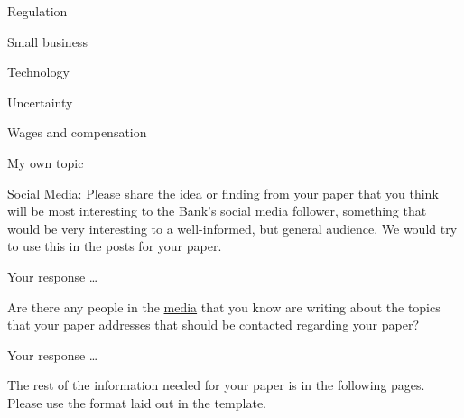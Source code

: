 \begin{instructionspage}
\begin{multicols}{2}
    \checkbox Regulation

    \checkbox Small business

    \checkbox Technology

    \checkbox Uncertainty

    \checkbox Wages and compensation

    \selectnext
    \checkbox My own topic


    
    
    \end{multicols}

  \item
    \underline{Social Media}:
    Please share the idea or finding from your paper that you think will be most interesting
    to the Bank’s social media follower, something that would be very interesting
    to a well-informed, but general audience.
    We would try to use this in the posts for your paper.

    \begin{response}

     Your response \ldots
     
    \end{response}

    
  \item
    Are there any people in the \underline{media} that you know are writing
    about the topics that your paper addresses that should
    be contacted regarding your paper?

    \begin{response}

     Your response \ldots
      
    \end{response}

    
  \item
    The rest of the information needed for your
    paper is in the following pages.
    Please use the format laid out in the template.
    
\end{instructionspage}
